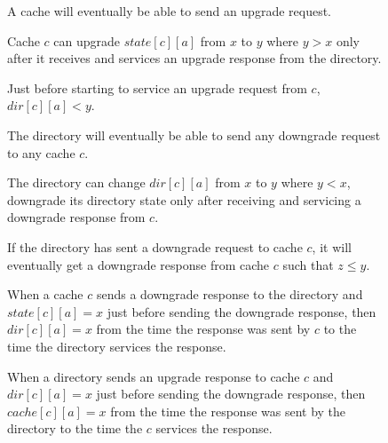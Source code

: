 \begin{figure}
\begin{inv}
A cache will eventually be able to send an upgrade request.
\label{csendreq}
\end{inv}
\begin{inv}
Cache $c$ can upgrade $state[c][a]$ from $x$ to $y$ where $y > x$ only after it
receives and services an upgrade response  from the directory.
\label{cwaitresp}
\end{inv}
\begin{inv}
Just before starting to service an upgrade request  from $c$,
$dir[c][a] < y$.
\label{drecvreq}
\end{inv}
\begin{inv}
The directory will eventually be able to send any downgrade request to any cache
$c$.
\label{dsendreq}
\end{inv}
\begin{inv}
The directory can change $dir[c][a]$ from $x$ to $y$ where $y < x$, \ie
downgrade its directory state only after receiving and servicing a downgrade
response  from $c$.
\label{dwaitresp}
\end{inv}
\begin{inv}
If the directory has sent a downgrade request  to cache $c$,
it will eventually get a downgrade response  from cache $c$
such that $z \le y$.
\label{drecvresp}
\end{inv}
\begin{inv}
When a cache $c$ sends a downgrade response  to the
directory and $state[c][a] = x$ just before sending the downgrade response, then
$dir[c][a] = x$ from the time the response was sent by $c$ to the time the
directory services the response.
\label{cknows}
\end{inv}
\begin{inv}
When a directory sends an upgrade response  to cache $c$ and
$dir[c][a] = x$ just before sending the downgrade response, then $cache[c][a] = x$
from the time the response was sent by the directory to the time the $c$
services the response.
\label{dknows}
\end{inv}

\end{figure}
